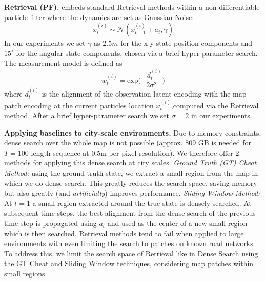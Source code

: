         \textbf{Retrieval (PF).} \citet{9635972GausePF} embeds standard Retrieval methods within a non-differentiable particle filter where the dynamics are set as Gaussian Noise:
        \begin{equation}
            x_t^{(i)} \sim \mathcal{N}(x_{t-1}^{(i)} + a_t, \gamma)
        \end{equation}
        In our experiments we set $\gamma$ as $2.5m$ for the x-y state position components and $15^{\circ}$ for the angular state components, chosen via a brief hyper-parameter search.  The measurement model is defined as
        \begin{equation}
            w_t^{(i)} = \text{exp}\Bigg( \frac{-d_t^{(i)}}{2 \sigma^2} \Bigg)
        \end{equation}
    where $d_t^{(i)}$ is the alignment of the observation latent encoding with the map patch encoding at the current particles location $x_t^{(i)}$,computed via the Retrieval method.  After a brief hyper-parameter search we set $\sigma = 2$  in our experiments.


        \textbf{Applying baselines to city-scale environments.} Due to memory constraints, dense search over the whole map is not possible (approx. 809 GB is needed for $T=100$ length sequence at 0.5m per pixel resolution). We therefore offer 2 methods for applying this dense search at city scales.  \emph{Ground Truth (GT) Cheat Method:} using the ground truth state, we extract a small region from the map in which we do dense search. This greatly reduces the search space, saving memory but also greatly (and \emph{artificially}) improves performance. \emph{Sliding Window Method:} At $t=1$ a small region extracted around the true state is densely searched. At subsequent time-steps, the best alignment from the dense search of the previous time-step is propagated using $a_t$ and used as the center of a new small region which is then searched. Retrieval methods tend to fail when applied to large environments with \citet{9635972GausePF} even limiting the search to patches on known road networks. To address this, we limit the search space of Retrieval like in Dense Search using the GT Cheat and Sliding Window techniques, considering map patches within small regions.


